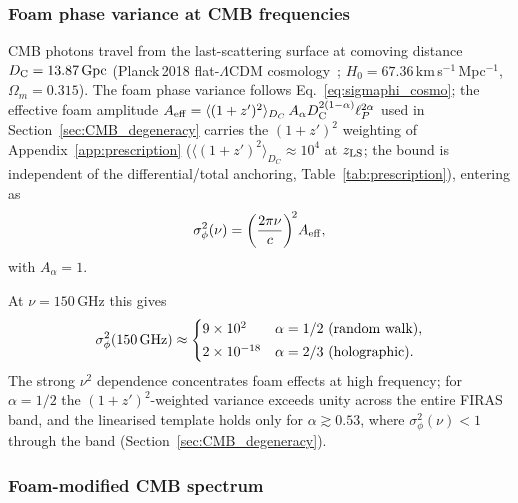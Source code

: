 \documentclass[aps,prd,onecolumn,amsmath,amssymb]{revtex4-2}
\begin{document}
\subsubsection{Foam phase variance at CMB frequencies}
\label{sec:CMB_phasevar}

CMB photons travel from the last-scattering surface at comoving distance
$D_{\rm C}= 13.87\,{\rm Gpc}$ (Planck\,2018 flat-$\Lambda$CDM cosmology~\cite{Aghanim2020};
$H_0 = 67.36$\,km\,s$^{-1}$\,Mpc$^{-1}$, $\Omega_m=0.315$).  The foam phase variance follows
Eq.~\eqref{eq:sigmaphi_cosmo}; the effective foam amplitude
$A_{\rm eff}=\langle(1+z')^2\rangle_{D_C}\,A_\alpha D_{\rm C}^{2(1-\alpha)}\ell_P^{2\alpha}$
used in Section~\ref{sec:CMB_degeneracy} carries the $(1+z')^2$ weighting of
Appendix~\ref{app:prescription} ($\langle(1+z')^2\rangle_{D_C}\approx10^{4}$ at
$z_{\rm LS}$; the bound is independent of the differential/total anchoring,
Table~\ref{tab:prescription}), entering as
\begin{equation}
  \sigma_\phi^2(\nu)
    = \left(\frac{2\pi\nu}{c}\right)^{\!2}\! A_{\rm eff},
  \label{eq:sigma_phi_CMB}
\end{equation}
with $A_\alpha=1$.

At $\nu=150$\,GHz this gives
\begin{equation}
  \sigma_\phi^2(150\,{\rm GHz})\approx
  \begin{cases}
    9\times10^{2}  & \alpha=1/2\ \text{(random walk)},\\[2pt]
    2\times10^{-18}      & \alpha=2/3\ \text{(holographic)}.
  \end{cases}
  \label{eq:sigma_phi_CMB_values}
\end{equation}
The strong $\nu^2$ dependence concentrates foam effects at high
frequency; for $\alpha=1/2$ the $(1+z')^2$-weighted variance exceeds unity
across the entire FIRAS band, and the linearised template holds only for
$\alpha\gtrsim0.53$, where $\sigma_\phi^2(\nu)<1$ through the band
(Section~\ref{sec:CMB_degeneracy}).

\subsubsection{Foam-modified CMB spectrum}
\label{sec:CMB_derivation}
\end{document}
